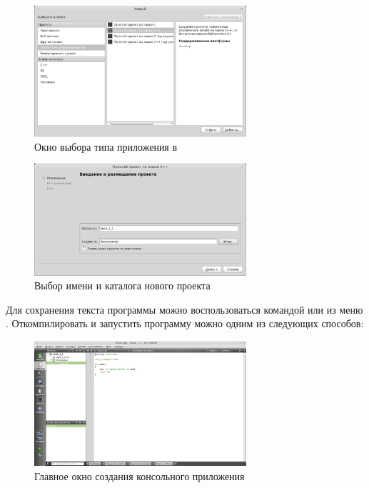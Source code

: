 \begin{figure}[htb]
\begin{center}
\includegraphics[width=0.7\textwidth]{img/ris_1_2_rus}
\caption{Окно выбора типа приложения в }
\label{ch01:refDrawing1}
\end{center}
\end{figure}

\begin{figure}[htb]
\begin{center}
\includegraphics[width=0.7\textwidth]{img/ris_1_3_rus}
\caption{Выбор имени и каталога нового проекта}
\label{ch01:refDrawing2}
\end{center}
\end{figure}

Для сохранения текста программы можно воспользоваться командой  или  из меню
. Откомпилировать и запустить программу можно одним из следующих
способов:

\begin{figure}[htb]
\begin{center}
\includegraphics[width=0.7\textwidth]{img/ris_1_4_rus}
\caption{Главное окно создания консольного приложения}
\label{ch01:refDrawing3}
\end{center}
\end{figure}

